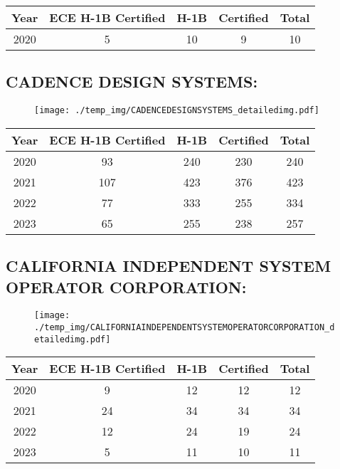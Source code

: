 \documentclass{article}%
\begin{document}
%
\begin{longtable}{c|c|c|c|c}%
\hline%
Year&ECE H{-}1B Certified&H{-}1B&Certified&Total\\%
\hline%
2020&5&10&9&10\\%
\hline%
\end{longtable}

%
\newpage%
\subsection{CADENCE DESIGN SYSTEMS:}%
\label{subsec:CADENCEDESIGNSYSTEMS}%
\label{CADENCEDESIGNSYSTEMSdetailed}%


\begin{figure}[htbp]%
\centering%
\texttt{[image: ./temp\_img/CADENCEDESIGNSYSTEMS\_detailedimg.pdf]}%
\end{figure}

%
\begin{longtable}{c|c|c|c|c}%
\hline%
Year&ECE H{-}1B Certified&H{-}1B&Certified&Total\\%
\hline%
2020&93&240&230&240\\%
\hline%
2021&107&423&376&423\\%
\hline%
2022&77&333&255&334\\%
\hline%
2023&65&255&238&257\\%
\hline%
\end{longtable}

%
\newpage%
\subsection{CALIFORNIA INDEPENDENT SYSTEM OPERATOR CORPORATION:}%
\label{subsec:CALIFORNIAINDEPENDENTSYSTEMOPERATORCORPORATION}%
\label{CALIFORNIAINDEPENDENTSYSTEMOPERATORCORPORATIONdetailed}%


\begin{figure}[htbp]%
\centering%
\texttt{[image: ./temp\_img/CALIFORNIAINDEPENDENTSYSTEMOPERATORCORPORATION\_detailedimg.pdf]}%
\end{figure}

%
\begin{longtable}{c|c|c|c|c}%
\hline%
Year&ECE H{-}1B Certified&H{-}1B&Certified&Total\\%
\hline%
2020&9&12&12&12\\%
\hline%
2021&24&34&34&34\\%
\hline%
2022&12&24&19&24\\%
\hline%
2023&5&11&10&11\\%
\hline%
\end{longtable}
\end{document}
